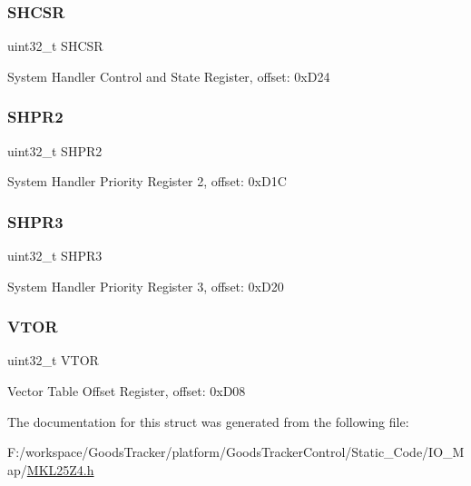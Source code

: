 \subsubsection{\texorpdfstring{S\+H\+C\+SR}{SHCSR}}
{\footnotesize\ttfamily uint32\+\_\+t S\+H\+C\+SR}

System Handler Control and State Register, offset\+: 0x\+D24 \mbox{\label{struct_s_c_b___mem_map_a4fa6448cb8510e61433afa5f024a1579}} 
\subsubsection{\texorpdfstring{S\+H\+P\+R2}{SHPR2}}
{\footnotesize\ttfamily uint32\+\_\+t S\+H\+P\+R2}

System Handler Priority Register 2, offset\+: 0x\+D1C \mbox{\label{struct_s_c_b___mem_map_aa7e2c4b036de2b98b1b578b4e638978c}} 
\subsubsection{\texorpdfstring{S\+H\+P\+R3}{SHPR3}}
{\footnotesize\ttfamily uint32\+\_\+t S\+H\+P\+R3}

System Handler Priority Register 3, offset\+: 0x\+D20 \mbox{\label{struct_s_c_b___mem_map_a3799e3af2b9f5d2f0740354953ba509d}} 
\subsubsection{\texorpdfstring{V\+T\+OR}{VTOR}}
{\footnotesize\ttfamily uint32\+\_\+t V\+T\+OR}

Vector Table Offset Register, offset\+: 0x\+D08 

The documentation for this struct was generated from the following file\+:\begin{DoxyCompactItemize}
\item 
F\+:/workspace/\+Goods\+Tracker/platform/\+Goods\+Tracker\+Control/\+Static\+\_\+\+Code/\+I\+O\+\_\+\+Map/\hyperlink{_m_k_l25_z4_8h}{M\+K\+L25\+Z4.\+h}\end{DoxyCompactItemize}
